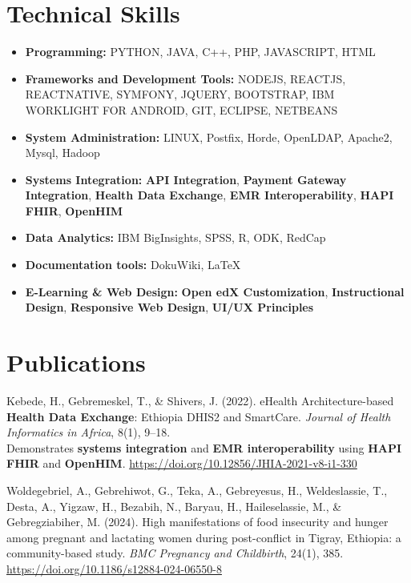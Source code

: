 \documentclass[11pt,a4paper]{article}
\begin{document}
\section*{ Technical Skills}
\begin{itemize}
  \item {} \textbf{Programming:} PYTHON, JAVA, C++, PHP, JAVASCRIPT, HTML
  \item {} \textbf{Frameworks and Development Tools:} NODEJS, REACTJS, REACTNATIVE, SYMFONY, JQUERY, BOOTSTRAP, IBM WORKLIGHT FOR ANDROID, GIT, ECLIPSE, NETBEANS
  \item {} \textbf{System Administration:} LINUX, Postfix, Horde, OpenLDAP, Apache2, Mysql, Hadoop
  \item {} \textbf{Systems Integration:} \textbf{API Integration}, \textbf{Payment Gateway Integration}, \textbf{Health Data Exchange}, \textbf{EMR Interoperability}, \textbf{HAPI FHIR}, \textbf{OpenHIM}
  \item {} \textbf{Data Analytics:} IBM BigInsights, SPSS, R, ODK, RedCap
  \item {} \textbf{Documentation tools:} DokuWiki, \LaTeX
  \item {} \textbf{E-Learning \& Web Design:} \textbf{Open edX Customization}, \textbf{Instructional Design}, \textbf{Responsive Web Design}, \textbf{UI/UX Principles}
\end{itemize}

\section*{ Publications}
 Kebede, H., Gebremeskel, T., \& Shivers, J. (2022). eHealth Architecture-based \textbf{Health Data Exchange}: Ethiopia DHIS2 and SmartCare. \textit{Journal of Health Informatics in Africa}, 8(1), 9--18. \\ Demonstrates \textbf{systems integration} and \textbf{EMR interoperability} using \textbf{HAPI FHIR} and \textbf{OpenHIM}.
\url{https://doi.org/10.12856/JHIA-2021-v8-i1-330}

\vspace{0.5em}
 Woldegebriel, A., Gebrehiwot, G., Teka, A., Gebreyesus, H., Weldeslassie, T., Desta, A., Yigzaw, H., Bezabih, N., Baryau, H., Haileselassie, M., \& Gebregziabiher, M. (2024). High manifestations of food insecurity and hunger among pregnant and lactating women during post-conflict in Tigray, Ethiopia: a community-based study. \textit{BMC Pregnancy and Childbirth}, 24(1), 385. \\
\url{https://doi.org/10.1186/s12884-024-06550-8}
\end{document}
